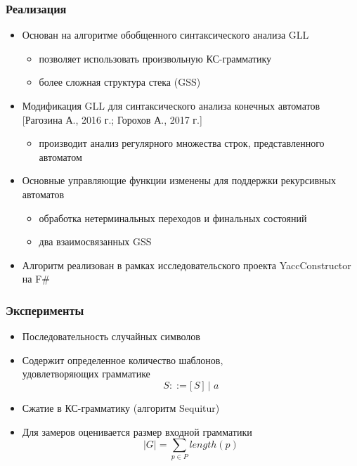\documentclass{beamer}
\begin{document}
\begin{frame}
	\transwipe[direction=90]
	\frametitle{Реализация}
	\begin{itemize}
		\item Основан на алгоритме обобщенного синтаксического анализа GLL
		\begin{itemize}
			\item позволяет использовать произвольную КС-грамматику
			\item более сложная структура стека (GSS)
		\end{itemize}
		\item Модификация GLL для синтаксического анализа конечных автоматов [Рагозина А., 2016 г.; Горохов А., 2017 г.]
		\begin{itemize}
			\item производит анализ регулярного множества строк, \linebreak представленного автоматом
		\end{itemize}
		\item Основные управляющие функции изменены для поддержки рекурсивных автоматов
		\begin{itemize}
			\item обработка нетерминальных переходов и финальных состояний
			\item два взаимосвязанных GSS
		\end{itemize}
		\item Алгоритм реализован в рамках исследовательского проекта YaccConstructor на F$\#$
	\end{itemize}
\end{frame}

\begin{frame}
	\transwipe[direction=90]
	\frametitle{Эксперименты}
	\begin{itemize}
		\item Последовательность случайных символов
		\item Содержит определенное количество шаблонов, \\ удовлетворяющих грамматике $$S ::= \texttt{[} \, S \, \texttt{]} \, \, | \, \, a$$
		\item Сжатие в КС-грамматику (алгоритм Sequitur)
		\item Для замеров оценивается размер входной грамматики
		$$ |G| = \sum_{p \in P} length(p) $$
	\end{itemize}
\end{frame}
\end{document}
